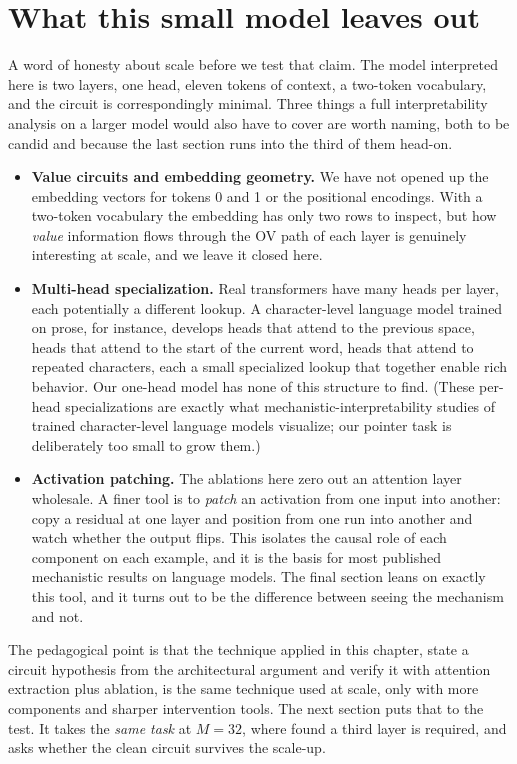 \section{What this small model leaves out}\label{sec:small-model-limits}

A word of honesty about scale before we test that claim. The model interpreted
here is two layers, one head, eleven tokens of context, a two-token vocabulary,
and the circuit is correspondingly minimal. Three things a full interpretability
analysis on a larger model would also have to cover are worth naming, both to be
candid and because the last section runs into the third of them head-on.

\begin{itemize}
\item \textbf{Value circuits and embedding geometry.} We have not opened up the
embedding vectors for tokens 0 and 1 or the positional encodings. With a
two-token vocabulary the embedding has only two rows to inspect, but how
\emph{value} information flows through the OV path of each layer is genuinely
interesting at scale, and we leave it closed here.

\item \textbf{Multi-head specialization.} Real transformers have many heads per
layer, each potentially a different lookup. A character-level language model
trained on prose, for instance, develops heads that attend to the previous space,
heads that attend to the start of the current word, heads that attend to repeated
characters, each a small specialized lookup that together enable rich behavior.
Our one-head model has none of this structure to find. (These per-head
specializations are exactly what mechanistic-interpretability studies of trained
character-level language models visualize; our pointer task is deliberately too
small to grow them.)

\item \textbf{Activation patching.} The ablations here zero out an attention
layer wholesale. A finer tool is to \emph{patch} an activation from one input
into another: copy a residual at one layer and position from one run into another
and watch whether the output flips. This isolates the causal role of each
component on each example, and it is the basis for most published mechanistic
results on language models. The final section leans on exactly this tool, and it
turns out to be the difference between seeing the mechanism and not.
\end{itemize}

The pedagogical point is that the technique applied in this chapter, state a
circuit hypothesis from the architectural argument and verify it with attention
extraction plus ablation, is the same technique used at scale, only with more
components and sharper intervention tools. The next section puts that to the
test. It takes the \emph{same task} at $M = 32$, where 
found a third layer is required, and asks whether the clean circuit survives the
scale-up.
